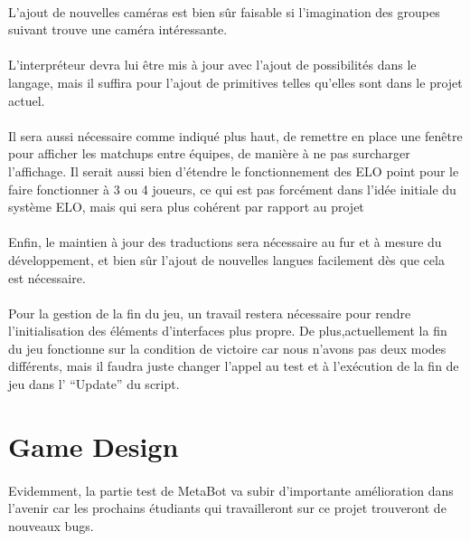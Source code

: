 \documentclass{report}
\begin{document}
\paragraph{}
L’ajout de nouvelles caméras est bien sûr faisable si l’imagination des groupes suivant trouve une caméra intéressante. 
\paragraph{}
L’interpréteur devra lui être mis à jour avec l’ajout de possibilités dans le langage, mais il suffira pour l’ajout de primitives telles qu’elles sont dans le projet actuel.
\paragraph{}
Il sera aussi nécessaire comme indiqué plus haut, de remettre en place une fenêtre pour afficher les matchups entre équipes, de manière à ne pas surcharger l’affichage. Il serait aussi bien d’étendre le fonctionnement des ELO point pour le faire fonctionner à 3 ou 4 joueurs, ce qui est pas forcément dans l’idée initiale du système ELO, mais qui sera plus cohérent par rapport au projet
\paragraph{}
Enfin, le maintien à jour des traductions sera nécessaire au fur et à mesure du développement, et bien sûr l’ajout de nouvelles langues facilement dès que cela est nécessaire.
\paragraph{}
Pour la gestion de la fin du jeu, un travail restera nécessaire pour rendre l’initialisation des éléments d’interfaces plus propre. De plus,actuellement la fin du jeu fonctionne sur la condition de victoire car nous n’avons pas deux modes différents, mais il faudra juste changer l’appel au test et à l'exécution de la fin de jeu dans l’ “Update” du script.

\section{Game Design}

\paragraph{}
  Evidemment, la partie test de MetaBot va subir d’importante amélioration dans l’avenir car les prochains étudiants qui travailleront sur ce projet trouveront de nouveaux bugs.
\end{document}
